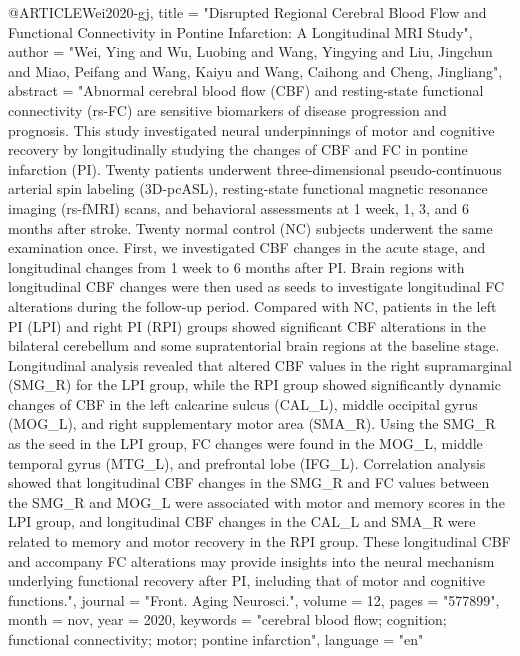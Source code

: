 @ARTICLE{Wei2020-gj,
	title    = "Disrupted Regional Cerebral Blood Flow and Functional
	Connectivity in Pontine Infarction: A Longitudinal {MRI} Study",
	author   = "Wei, Ying and Wu, Luobing and Wang, Yingying and Liu, Jingchun
	and Miao, Peifang and Wang, Kaiyu and Wang, Caihong and Cheng,
	Jingliang",
	abstract = "Abnormal cerebral blood flow (CBF) and resting-state functional
	connectivity (rs-FC) are sensitive biomarkers of disease
	progression and prognosis. This study investigated neural
	underpinnings of motor and cognitive recovery by longitudinally
	studying the changes of CBF and FC in pontine infarction (PI).
	Twenty patients underwent three-dimensional pseudo-continuous
	arterial spin labeling (3D-pcASL), resting-state functional
	magnetic resonance imaging (rs-fMRI) scans, and behavioral
	assessments at 1 week, 1, 3, and 6 months after stroke. Twenty
	normal control (NC) subjects underwent the same examination once.
	First, we investigated CBF changes in the acute stage, and
	longitudinal changes from 1 week to 6 months after PI. Brain
	regions with longitudinal CBF changes were then used as seeds to
	investigate longitudinal FC alterations during the follow-up
	period. Compared with NC, patients in the left PI (LPI) and right
	PI (RPI) groups showed significant CBF alterations in the
	bilateral cerebellum and some supratentorial brain regions at the
	baseline stage. Longitudinal analysis revealed that altered CBF
	values in the right supramarginal (SMG\_R) for the LPI group,
	while the RPI group showed significantly dynamic changes of CBF
	in the left calcarine sulcus (CAL\_L), middle occipital gyrus
	(MOG\_L), and right supplementary motor area (SMA\_R). Using the
	SMG\_R as the seed in the LPI group, FC changes were found in the
	MOG\_L, middle temporal gyrus (MTG\_L), and prefrontal lobe
	(IFG\_L). Correlation analysis showed that longitudinal CBF
	changes in the SMG\_R and FC values between the SMG\_R and MOG\_L
	were associated with motor and memory scores in the LPI group,
	and longitudinal CBF changes in the CAL\_L and SMA\_R were
	related to memory and motor recovery in the RPI group. These
	longitudinal CBF and accompany FC alterations may provide
	insights into the neural mechanism underlying functional recovery
	after PI, including that of motor and cognitive functions.",
	journal  = "Front. Aging Neurosci.",
	volume   =  12,
	pages    = "577899",
	month    =  nov,
	year     =  2020,
	keywords = "cerebral blood flow; cognition; functional connectivity; motor;
	pontine infarction",
	language = "en"
}

